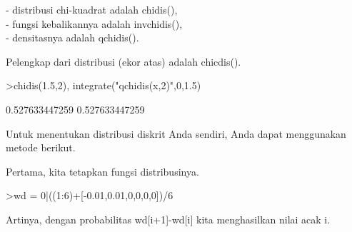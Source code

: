 \documentclass[a4paper,10pt]{article}
\begin{document}
\begin{eulernotebook}
\begin{eulercomment}
\begin{eulercomment}
\begin{eulercomment}
\begin{eulercomment}
\begin{eulercomment}
\begin{eulercomment}
\begin{eulercomment}
\begin{eulercomment}
\begin{eulercomment}
\begin{eulercomment}
\begin{eulercomment}
\begin{eulercomment}
\begin{eulercomment}
\begin{eulercomment}
\begin{eulercomment}
\begin{eulercomment}
\begin{eulercomment}
\begin{eulercomment}
\begin{eulercomment}
\begin{eulercomment}
\begin{eulercomment}
\begin{eulercomment}
\begin{eulercomment}
\begin{eulercomment}
\begin{eulercomment}
\begin{eulercomment}
\begin{eulercomment}
\begin{eulercomment}
\begin{eulercomment}
\begin{eulercomment}
\begin{eulercomment}
\begin{eulercomment}
\begin{eulercomment}
\begin{eulercomment}
\begin{eulercomment}
\begin{eulercomment}
\begin{eulercomment}
\begin{eulercomment}
\begin{eulercomment}
\begin{eulercomment}
\begin{eulercomment}
\begin{eulercomment}
\begin{eulercomment}
\begin{eulercomment}
\begin{eulercomment}
- distribusi chi-kuadrat adalah chidis(),\\
- fungsi kebalikannya adalah invchidis(),\\
- densitasnya adalah qchidis().

Pelengkap dari distribusi (ekor atas) adalah chicdis().
\end{eulercomment}
\begin{eulerprompt}
>chidis(1.5,2), integrate("qchidis(x,2)",0,1.5)
\end{eulerprompt}
\begin{euleroutput}
  0.527633447259
  0.527633447259
\end{euleroutput}
\begin{eulercomment}
Untuk menentukan distribusi diskrit Anda sendiri, Anda dapat
menggunakan metode berikut.

Pertama, kita tetapkan fungsi distribusinya.
\end{eulercomment}
\begin{eulerprompt}
>wd = 0|((1:6)+[-0.01,0.01,0,0,0,0])/6
\end{eulerprompt}
\begin{euleroutput}
  [0,  0.165,  0.335,  0.5,  0.666667,  0.833333,  1]
\end{euleroutput}
\begin{eulercomment}
Artinya, dengan probabilitas wd[i+1]-wd[i] kita menghasilkan nilai
acak i.


\end{eulercomment}
\end{eulercomment}
\end{eulercomment}
\end{eulercomment}
\end{eulercomment}
\end{eulercomment}
\end{eulercomment}
\end{eulercomment}
\end{eulercomment}
\end{eulercomment}
\end{eulercomment}
\end{eulercomment}
\end{eulercomment}
\end{eulercomment}
\end{eulercomment}
\end{eulercomment}
\end{eulercomment}
\end{eulercomment}
\end{eulercomment}
\end{eulercomment}
\end{eulercomment}
\end{eulercomment}
\end{eulercomment}
\end{eulercomment}
\end{eulercomment}
\end{eulercomment}
\end{eulercomment}
\end{eulercomment}
\end{eulercomment}
\end{eulercomment}
\end{eulercomment}
\end{eulercomment}
\end{eulercomment}
\end{eulercomment}
\end{eulercomment}
\end{eulercomment}
\end{eulercomment}
\end{eulercomment}
\end{eulercomment}
\end{eulercomment}
\end{eulercomment}
\end{eulercomment}
\end{eulercomment}
\end{eulercomment}
\end{eulercomment}
\end{eulernotebook}
\end{document}
